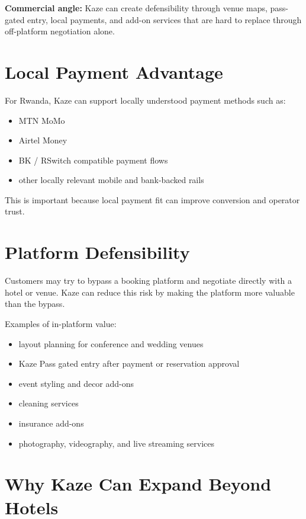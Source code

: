 \documentclass[11pt,a4paper]{article}
\begin{document}
\begin{kazehighlightbox}
\textbf{Commercial angle:} Kaze can create defensibility through venue maps, pass-gated entry, local payments, and add-on services that are hard to replace through off-platform negotiation alone.
\end{kazehighlightbox}

\section{Local Payment Advantage}

For Rwanda, Kaze can support locally understood payment methods such as:
\begin{itemize}
    \item MTN MoMo
    \item Airtel Money
    \item BK / RSwitch compatible payment flows
    \item other locally relevant mobile and bank-backed rails
\end{itemize}

This is important because local payment fit can improve conversion and operator trust.

\section{Platform Defensibility}

Customers may try to bypass a booking platform and negotiate directly with a hotel or venue. Kaze can reduce this risk by making the platform more valuable than the bypass.

Examples of in-platform value:
\begin{itemize}
    \item layout planning for conference and wedding venues
    \item Kaze Pass gated entry after payment or reservation approval
    \item event styling and decor add-ons
    \item cleaning services
    \item insurance add-ons
    \item photography, videography, and live streaming services
\end{itemize}

\section{Why Kaze Can Expand Beyond Hotels}
\end{document}
